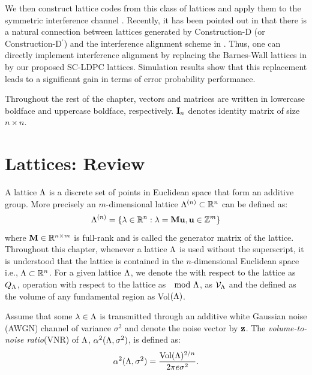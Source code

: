 We then construct lattice codes from this class of lattices and apply them to the symmetric interference channel \cite{jafar10}.  Recently, it has been pointed out in \cite{Estela13} that there is a natural connection between lattices generated by Construction-D (or Construction-D$^\prime$) and the interference alignment scheme in \cite{jafar10}. Thus, one can directly implement interference alignment by replacing the Barnes-Wall lattices in \cite{Estela13} by our proposed SC-LDPC lattices. Simulation results show that this replacement leads to a significant gain in terms of error probability performance. 

Throughout the rest of the chapter, vectors and matrices are written in lowercase boldface and uppercase boldface, respectively. $\mathbf{I}_{n}$ denotes identity matrix of size $n\times n$.

\section{Lattices: Review}\label{Section:Background}
A lattice $\Lambda$ is a discrete set of points in Euclidean space that form an additive group. More precisely an $m$-dimensional lattice $\Lambda^{(n)}\subset \mathbb{R}^{n}$ can be defined as:
\begin{equation}
\Lambda^{(n)} =\{\lambda\in\mathbb{R}^{n}:\lambda=\mathbf{M}\mathbf{u},\mathbf{u}\in \mathbb{Z}^{m}\}
\end{equation}
where $\mathbf{M}\in\mathbb{R}^{n \times m}$ is full-rank and is called the generator matrix of the lattice. Throughout this chapter, whenever a lattice $\Lambda$ is used without the superscript, it is understood that the lattice is contained in the $n$-dimensional Euclidean space i.e., $\Lambda\subset \mathbb{R}^{n}$. For a given lattice $\Lambda$, we denote the  with respect to the lattice as $Q_{\Lambda}$,   operation with respect to the lattice as $\mod {\Lambda}$,   as $\mathcal{V}_{\Lambda}$ and the  defined as the volume of any fundamental region as Vol$(\Lambda)$\cite{erez2004achieving}.

Assume that some $\mathbf{\lambda}\in\Lambda$ is transmitted through an additive white Gaussian noise (AWGN) channel of variance $\sigma^{2}$ and denote the noise vector by $\mathbf{z}$. The \textit{volume-to-noise ratio}(VNR) of $\Lambda$, $\alpha^{2}(\Lambda,\sigma^{2})$, is defined as:
\begin{equation}\label{Eqn:VNRDefinition}
\alpha^{2}(\Lambda,\sigma^{2})=\frac{\text{Vol}(\Lambda)^{2/n}}{2\pi e\sigma^{2}}.
\end{equation}

